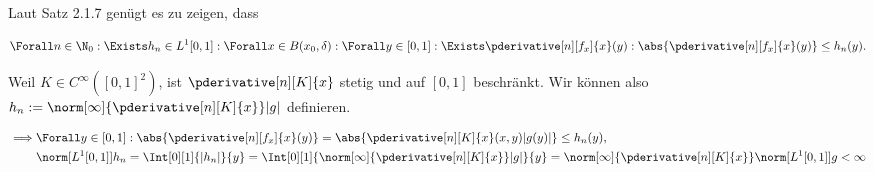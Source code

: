\begin{solution}

Laut Satz 2.1.7 genügt es zu zeigen, dass

\begin{align*}
    \Forall n \in \N_0:
    \Exists h_n \in L^1[0, 1]:
    \Forall x \in B(x_0, \delta):
    \Forall y \in [0, 1]:
    \Exists \pderivative[n][f_x]{x}(y):
    \abs{\pderivative[n][f_x]{x}(y)} \leq h_n(y).
\end{align*}

Weil $K \in C^\infty([0, 1]^2)$, ist $\pderivative[n][K]{x}$ stetig und auf $[0, 1]$ beschränkt.
Wir können also $h_n := \norm[\infty]{\pderivative[n][K]{x}} |g|$ definieren.

\begin{align*}
    \implies
    & \Forall y \in [0, 1]: \abs{\pderivative[n][f_x]{x}(y)} = \abs{\pderivative[n][K]{x}(x, y) |g(y)|} \leq h_n(y), \\
    & \norm[{L^1[0, 1]}]{h_n} = \Int[0][1]{|h_n|}{y} = \Int[0][1]{\norm[\infty]{\pderivative[n][K]{x}} |g|}{y} = \norm[\infty]{\pderivative[n][K]{x}} \norm[{L^1[0, 1]}]{g} < \infty
\end{align*}

\end{solution}

